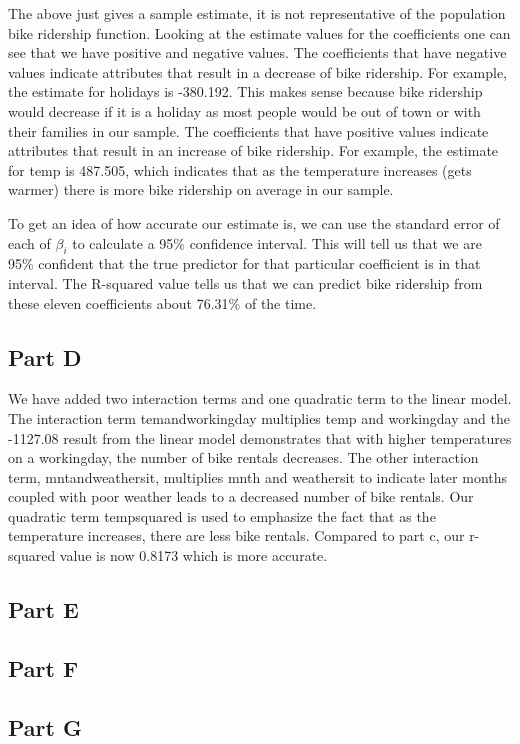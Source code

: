 \documentclass[11pt]{article}
\begin{document}
The above just gives a sample estimate, it is not representative of the population bike ridership function. Looking at the estimate values for the coefficients one can see that we have positive and negative values. The coefficients that have negative values indicate attributes that result in a decrease of bike ridership. For example, the estimate for holidays is -380.192. This makes sense because bike ridership would decrease if it is a holiday as most people would be out of town or with their families in our sample. The coefficients that have positive values indicate attributes that result in an increase of bike ridership. For example, the estimate for temp is 487.505, which indicates that as the temperature increases (gets warmer) there is more bike ridership on average in our sample.  

To get an idea of how accurate our estimate is, we can use the standard error of each of $\beta_i$ to calculate a 95\% confidence interval. This will tell us that we are 95\% confident that the true predictor for that particular coefficient is in that interval. The R-squared value tells us that we can predict bike ridership from these eleven coefficients about 76.31\% of the time. 

\subsection{Part D}
\label{subsec:2d}
We have added two interaction terms and one quadratic term to the linear model. The interaction term temandworkingday multiplies temp and workingday and the -1127.08 result from the linear model demonstrates that with higher temperatures on a workingday, the number of bike rentals decreases. The other interaction term, mntandweathersit, multiplies mnth and weathersit to indicate later months coupled with poor weather leads to a decreased number of bike rentals. Our quadratic term tempsquared is used to emphasize the fact that as the temperature increases, there are less bike rentals.  
Compared to part c, our r-squared value is now 0.8173 which is more accurate. 
\subsection{Part E}
\label{subsec:2e}
\subsection{Part F}
\label{subsec:2f}
\subsection{Part G}
\label{subsec:2g}
\end{document}
